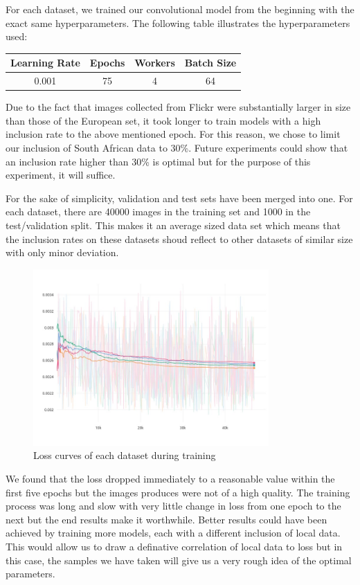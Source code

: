 \documentclass[conference]{IEEEtran}
\begin{document}
For each dataset, we trained our convolutional model from the beginning with the exact same hyperparameters. The following table illustrates the hyperparameters used:


\begin{table}[h!]
\centering
\renewcommand{\arraystretch}{1.5}
\begin{tabular}{|c|c|c|c|}
\hline 
Learning Rate & Epochs & Workers & Batch Size \\ 
\hline 
0.001 & 75 & 4 & 64 \\ 
\hline 
\end{tabular} 
\end{table}

Due to the fact that images collected from Flickr were substantially larger in size than those of the European set, it took longer to train models with a high inclusion rate to the above mentioned epoch. For this reason, we chose to limit our inclusion of South African data to 30\%. Future experiments could show that an inclusion rate higher than 30\% is optimal but for the purpose of this experiment, it will suffice.

For the sake of simplicity, validation and test sets have been merged into one. For each dataset, there are 40000 images in the training set and 1000 in the test/validation split. This makes it an average sized data set which means that the inclusion rates on these datasets shoud reflect to other datasets of similar size with only minor deviation.

\begin{figure}[h!]
\centering
\includegraphics[width=9cm]{Curves/loss_train}
\caption{Loss curves of each dataset during training}
\label{fig:loss_train}
\end{figure}

We found that the loss dropped immediately to a reasonable value within the first five epochs but the images produces were not of a high quality. The training process was long and slow with very little change in loss from one epoch to the next but the end results make it worthwhile. Better results could have been achieved by training more models, each with a different inclusion of local data. This would allow us to draw a definative correlation of local data to loss but in this case, the samples we have taken will give us a very rough idea of the optimal parameters.
\end{document}

